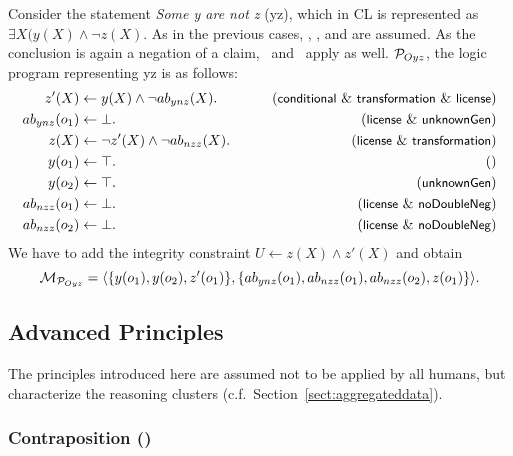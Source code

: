 \documentclass[12pt]{article}
\begin{document}
Consider the statement \textit{Some y are not z} ({\MO yz}), which in CL is represented as $\exists X (y(X) \wedge \neg z(X)$.
As in the previous cases, \conditionals, \licenses, and \unknownGen are assumed.
As the conclusion is again a negation of a claim, \transformation\ and
\dnegation\ apply as well. ${\cal P}_{Oyz}$, the logic program representing \MO yz is as follows:
\begin{align}
z'(X) & \leftarrow y(X) \wedge \neg \Ab_{ynz}(X). & \tag{\conditionals\ \&\ \transformation \ \&\ \licenses} \\
\Ab_{ynz}(o_1) & \leftarrow \bot. & \tag{\licenses\ \& \unknownGen} \\
z(X) & \leftarrow  \neg z'(X) \wedge \neg \Ab_{nzz}(X). &
\tag{\licenses\ \&\ \transformation} \\
y(o_1) & \leftarrow \top. & \tag{} \\
y(o_2) & \leftarrow \top. & \tag{\unknownGen} \\
\Ab_{nzz}(o_1)& \leftarrow \bot. & \tag{\licenses\ \&\ \dnegation}\\
\Ab_{nzz}(o_2)& \leftarrow \bot. & \tag{\licenses\ \&\ \dnegation}
\end{align}
We have to add the integrity constraint $U \leftarrow z(X) \wedge
z'(X)$
and obtain \[{\cal M}_{{\cal P}_{Oyz}} = \langle \{y(o_1), y(o_2), z'(o_1)\},\{ab_{ynz}(o_1),
ab_{nzz}(o_1), ab_{nzz}(o_2), z(o_1) \} \rangle.\]


\subsection{Advanced Principles}\label{sect:advanced}

The principles introduced here are assumed not to be applied by all humans, 
but characterize the reasoning clusters (c.f.\ Section~\ref{sect:aggregateddata}).


\subsubsection{Contraposition (\contraposition)}
\end{document}
